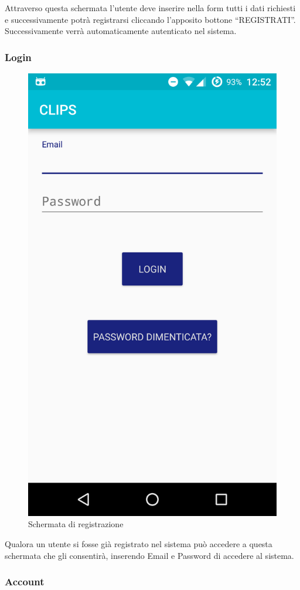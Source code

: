 Attraverso questa schermata l'utente deve inserire nella form tutti i dati richiesti e successivamente potrà registrarsi cliccando l'apposito bottone ``REGISTRATI''. Successivamente verrà automaticamente autenticato nel sistema.
\subsubsection{Login}
\begin{figure}[!h]
	\centering
	\includegraphics[scale=0.15]{screenshot/login}
	\caption{Schermata di registrazione}
\end{figure}
Qualora un utente si fosse già registrato nel sistema può accedere a questa schermata che gli consentirà, inserendo Email e Password di accedere al sistema.
\newpage


\subsubsection{Account}
